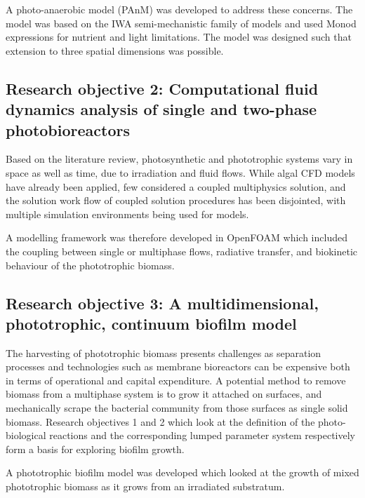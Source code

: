 A photo-anaerobic model (PAnM) was developed to address these concerns. The model was based on the IWA semi-mechanistic family of models and used Monod expressions for nutrient and light limitations. The model was designed such that extension to three spatial dimensions was possible. 

\subsection{Research objective 2: Computational fluid dynamics analysis of single and two-phase photobioreactors}
Based on the literature review, photosynthetic and phototrophic systems vary in space as well as time, due to irradiation and fluid flows. While algal CFD models have already been applied, few considered a coupled multiphysics solution, and the solution work flow of coupled solution procedures has been disjointed, with multiple simulation environments being used for models. 

A modelling framework was therefore developed in OpenFOAM which included the coupling between single or multiphase flows, radiative transfer, and biokinetic behaviour of the phototrophic biomass.

\subsection{Research objective 3: A multidimensional, phototrophic, continuum biofilm model}
The harvesting of phototrophic biomass presents challenges as separation processes and technologies such as membrane bioreactors can be expensive both in terms of operational and capital expenditure. A potential method to remove biomass from a multiphase system is to grow it attached on surfaces, and mechanically scrape the bacterial community from those surfaces as single solid biomass. Research objectives 1 and 2 which look at the definition of the photo-biological reactions and the corresponding lumped parameter system respectively form a basis for exploring biofilm growth. 

A phototrophic biofilm model was developed which looked at the growth of mixed phototrophic biomass as it grows from an irradiated substratum. 





